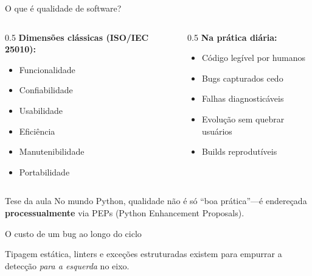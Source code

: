 \documentclass[aspectratio=169]{beamer}
\begin{document}
\begin{frame}[shrink=5]{O que é qualidade de software?}
  \begin{columns}[T]
    \begin{column}{0.5\textwidth}
      \textbf{Dimensões clássicas (ISO/IEC 25010):}
      \begin{itemize}
        \item Funcionalidade
        \item Confiabilidade
        \item Usabilidade
        \item Eficiência
        \item Manutenibilidade
        \item Portabilidade
      \end{itemize}
    \end{column}
    \begin{column}{0.5\textwidth}
      \textbf{Na prática diária:}
      \begin{itemize}
        \item Código legível por humanos
        \item Bugs capturados cedo
        \item Falhas diagnosticáveis
        \item Evolução sem quebrar usuários
        \item Builds reprodutíveis
      \end{itemize}
    \end{column}
  \end{columns}
  \begin{exampleblock}{Tese da aula}
    No mundo Python, qualidade não é só ``boa prática''---é endereçada
    \textbf{processualmente} via PEPs (Python Enhancement Proposals).
  \end{exampleblock}
\end{frame}

\begin{frame}[shrink=5]{O custo de um bug ao longo do ciclo}
  \begin{center}
  \end{center}
  \footnotesize Tipagem estática, linters e exceções estruturadas existem para
  empurrar a detecção \emph{para a esquerda} no eixo.
\end{frame}
\end{document}

